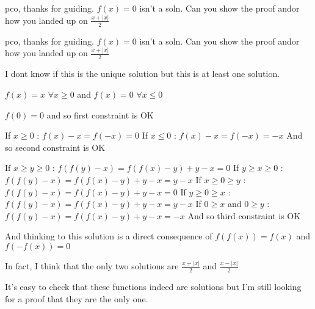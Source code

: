 \begin{solution}
	pco, thanks for guiding. $f(x)=0$ isn't a soln.
Can you show the proof and\/or how you landed up on $ \frac{x+|x|}{2} $
\end{solution}



\begin{solution}
	\begin{tcolorbox}pco, thanks for guiding. $f(x)=0$ isn't a soln.
Can you show the proof and\/or how you landed up on $ \frac{x+|x|}{2} $\end{tcolorbox}
I dont know if this is the unique solution but this is at least one solution.

$f(x)=x$ $\forall x\ge 0$ and $f(x)=0$ $\forall x\le 0$

$f(0)=0$ and so first constraint is OK

If $x\ge 0$ : $f(x)-x=f(-x)=0$
If $x\le 0$ : $f(x)-x=f(-x)=-x$
And so second constraint is OK

If $x\ge y\ge 0$ : $f(f(y)-x)=f(f(x)-y)+y-x=0$
If $y\ge x\ge 0$ : $f(f(y)-x)=f(f(x)-y)+y-x=y-x$
If $x\ge 0\ge y$ : $f(f(y)-x)=f(f(x)-y)+y-x=0$
If $y\ge 0\ge x$ : $f(f(y)-x)=f(f(x)-y)+y-x=y-x$
If $0\ge x$ and $0\ge y$ : $f(f(y)-x)=f(f(x)-y)+y-x=-x$
And so third constraint is OK


And thinking to this solution is a direct consequence of $f(f(x))=f(x)$ and $f(-f(x))=0$
\end{solution}



\begin{solution}
	In fact, I think that the only two solutions are $\frac{x+|x|}2$ and $\frac{x-|x|}2$

It's easy to check that these functions indeed are solutions but I'm still looking for a proof that they are the only one.
\end{solution}



